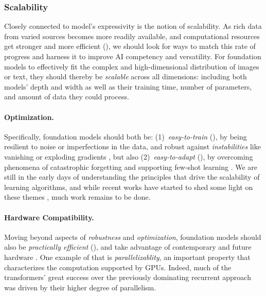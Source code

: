 \subsubsection{Scalability} 
\label{sec:modeling-scalability}

Closely connected to model's expressivity is the notion of scalability. As rich data from varied sources becomes more readily available, and computational resources get stronger and more efficient (), we should look for ways to match this rate of progress and harness it to improve AI competency and versatility. For foundation models to effectively fit the complex and high-dimensional distribution of images or text, they should thereby be \textit{scalable} across all dimensions: including both models' depth and width as well as their training time, number of parameters, and amount of data they could process. %

\paragraph{Optimization.} Specifically, foundation models should both be: (1)~\textit{easy-to-train} (), by being resilient to noise or imperfections in the data, and robust against \textit{instabilities} like vanishing \citep{helfrich2018orthogonal, glorot2010understanding} or exploding gradients \citep{lstms,nair2010rectified}, but also (2)~\textit{easy-to-adapt} (), by overcoming phenomena of catastrophic forgetting \citep{catastroph} and supporting few-shot learning \citep{fewshot}. We are still in the early days of understanding the principles that drive the scalability of learning algorithms, and while recent works have started to shed some light on these themes \citep{liu2020understanding, kuditipudi2020explaining, nakkiran2019deep}, much work remains to be done.

\paragraph{Hardware Compatibility.} Moving beyond aspects of \textit{robustness} and \textit{optimization}, foundation models should also be \textit{practically efficient} (), and take advantage of contemporary and future hardware \citep{2009_06489}. One example of that is \textit{parallelizablity}, an important property that characterizes the computation supported by GPUs. Indeed, much of the transformers' great success over the previously dominating recurrent approach was driven by their higher degree of parallelism. 

